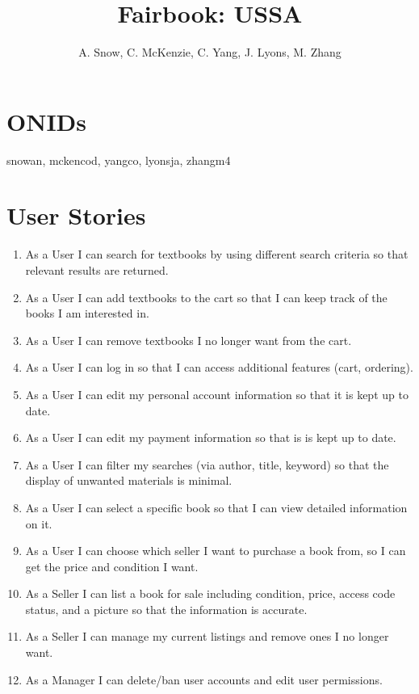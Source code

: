 \documentclass[12pt]{article}
\title{Fairbook: USSA}
\author{A. Snow, C. McKenzie, C. Yang, J. Lyons, M. Zhang}
\begin{document}
	\maketitle


	\tableofcontents
	\section{ONIDs}
		snowan, mckencod, yangco, lyonsja, zhangm4



	\section{User Stories}
	\begin{enumerate}
	\item As a User I can search for textbooks by using different search criteria so that relevant results are returned. 

	\item As a User I can add textbooks to the cart so that I can keep track of the books I am interested in.

	\item As a User I can remove textbooks I no longer want from the cart.

	\item As a User I can log in so that I can access additional features (cart, ordering). 

	\item As a User I can edit my personal account information so that it is kept up to date. 

	\item As a User I can edit my payment information so that is is kept up to date. 

	\item As a User I can filter my searches (via author, title, keyword) so that the display of unwanted materials is minimal.

	\item As a User I can select a specific book so that I can view detailed information on it.

	\item As a User I can choose which seller I want to purchase a book from, so I can get the price and condition I want. 

	\item As a Seller I can list a book for sale including condition, price, access code status, and a picture so that the information is accurate.

	\item As a Seller I can manage my current listings and remove ones I no longer want.

	\item As a Manager I can delete/ban user accounts and edit user permissions.
	\end{enumerate}
\end{document}
